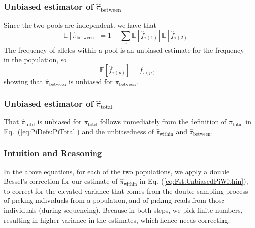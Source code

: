 \documentclass[letterpaper,fontsize=9pt,DIV=12]{scrartcl}
\newcommand\eqnref[1]{Eq.~(\ref{#1})}
\newcommand{\empfreq}{\widehat{f}}
\begin{document}

\subsubsection*{Unbiased estimator of \texorpdfstring{$\widehat{\pi}_\text{between}$}{Pi Between}}
\label{supp:sec:FST:sub:EstimatorsPi:sub:PiBetween}

Since the two pools are independent, we have that
\[
\mathbb{E}\left[\widehat{\pi}_\text{between}\right] = 1- \sum_\tau \mathbb{E}\left[\empfreq_{\tau(1)}\right]\mathbb{E}\left[\empfreq_{\tau(2)}\right]
\]
The frequency of alleles within a pool is an unbiased estimate for the frequency in the population, so
\[
\mathbb{E}\left[\empfreq_{\tau(p)}\right] = f_{\tau(p)}
\]
showing that $\widehat{\pi}_\text{between}$ is unbiased for $\pi_\text{between}$.


\subsubsection*{Unbiased estimator of \texorpdfstring{$\widehat{\pi}_\text{total}$}{Pi Total}}
\label{supp:sec:FST:sub:EstimatorsPi:sub:PiTotal}

That $\widehat{\pi}_\text{total}$ is unbiased for $\pi_\text{total}$ follows immediately from the definition of $\pi_\text{total}$ in \eqnref{eq:PiDefs:PiTotal} and the unbiasedness of $\widehat{\pi}_\text{within}$ and $\widehat{\pi}_\text{between}$.


\subsubsection*{Intuition and Reasoning}
\label{supp:sec:FST:sub:EstimatorsPi:sub:Intuition}

In the above equations, for each of the two populations, we apply a double Bessel's correction for our estimate of $\widehat{\pi}_\text{within}$ in \eqnref{eq:Fst:UnbiasedPiWithin}, to correct for the elevated variance that comes from the double sampling process of picking individuals from a population, and of picking reads from those individuals (during sequencing). Because in both steps, we pick finite numbers, resulting in higher variance in the estimates, which hence needs correcting. 
\end{document}
